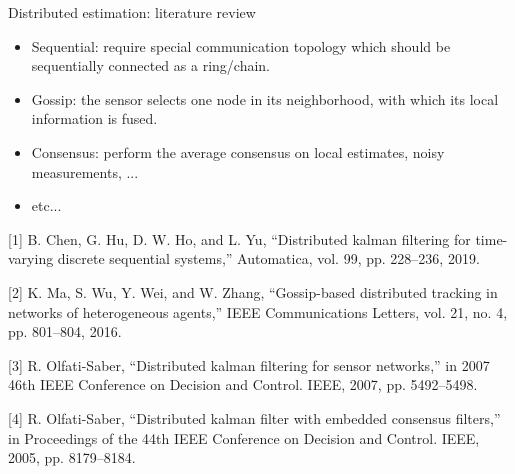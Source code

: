\documentclass[10pt]{beamer}
\DeclareMathOperator{\1}{\textbf{1}}
\begin{document}
	  \begin{frame}{Distributed estimation: literature review}
	    \begin{itemize}
	      \item Sequential: require special communication topology which should be sequentially connected as a ring/chain.
	      \item Gossip: the sensor selects one node in its neighborhood, with which its local information is fused.
	      \item Consensus: perform the average consensus on local estimates, noisy measurements, ... 
	      \item etc...
	    \end{itemize}
	    {\scriptsize [1] B. Chen, G. Hu, D. W. Ho, and L. Yu, ``Distributed kalman filtering
	      for time-varying discrete sequential systems,” Automatica, vol. 99, pp.
	      228–236, 2019.

	      [2] K. Ma, S. Wu, Y. Wei, and W. Zhang, ``Gossip-based distributed tracking
	      in networks of heterogeneous agents,” IEEE Communications Letters,
	      vol. 21, no. 4, pp. 801–804, 2016.

	      [3] R. Olfati-Saber, ``Distributed kalman filtering for sensor networks,” in
	      2007 46th IEEE Conference on Decision and Control. IEEE, 2007, pp.
	      5492–5498.

	      [4] R. Olfati-Saber, ``Distributed kalman filter with embedded consensus filters,” in
	      Proceedings of the 44th IEEE Conference on Decision and Control.
	      IEEE, 2005, pp. 8179–8184.

	    }
	  \end{frame}

\end{document}
